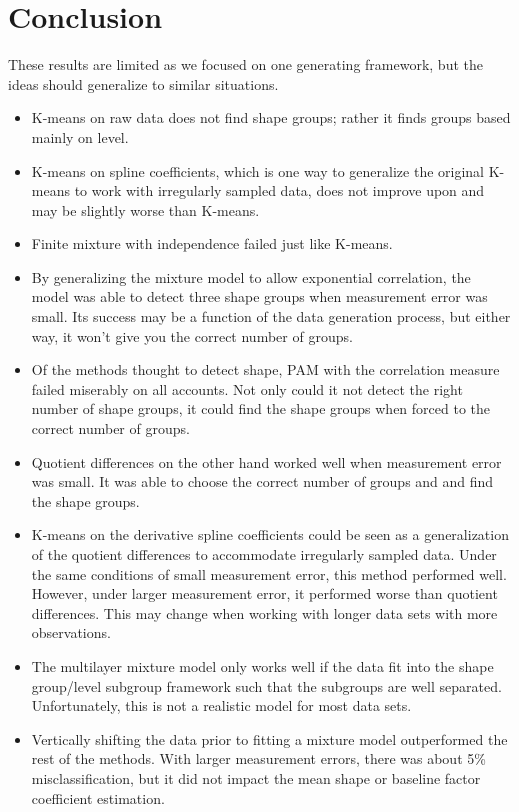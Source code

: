 \section{Conclusion}
These results are limited as we focused on one generating framework, but the ideas should generalize to similar situations.
\begin{itemize}
\item K-means on raw data does not find shape groups; rather it finds groups based mainly on level.
\item K-means on spline coefficients, which is one way to generalize the original K-means to work with irregularly sampled data, does not improve upon and may be slightly worse than K-means.
\item Finite mixture with independence failed just like K-means.
\item By generalizing the mixture model to allow exponential correlation, the model was able to detect three shape groups when measurement error was small. Its success may be a function of the data generation process, but either way, it won't give you the correct number of groups.
\item Of the methods thought to detect shape, PAM with the correlation measure failed miserably on all accounts. Not only could it not detect the right number of shape groups, it could find the shape groups when forced to the correct number of groups. 
\item Quotient differences on the other hand worked well when measurement error was small. It was able to choose the correct number of groups and and find the shape groups.
\item K-means on the derivative spline coefficients could be seen as a generalization of the quotient differences to accommodate irregularly sampled data. Under the same conditions of small measurement error, this method performed well. However, under larger measurement error, it performed worse than quotient differences. This may change when working with longer data sets with more observations.
\item The multilayer mixture model only works well if the data fit into the shape group/level subgroup framework such that the subgroups are well separated. Unfortunately, this is not a realistic model for most data sets. 
\item Vertically shifting the data prior to fitting a mixture model outperformed the rest of the methods. With larger measurement errors, there was about 5\% misclassification, but it did not impact the mean shape or baseline factor coefficient estimation.
\end{itemize}

